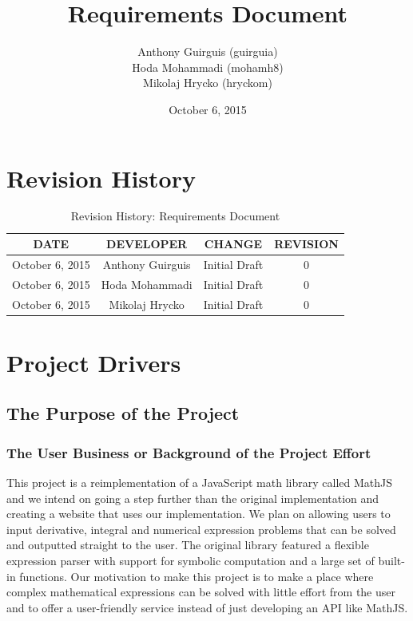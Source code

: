\documentclass[11pt, oneside]{article}
\title{Requirements Document}
\author{Anthony Guirguis (guirguia) \\ Hoda Mohammadi (mohamh8) \\ Mikolaj Hrycko (hryckom)}
\date{October 6, 2015}
\begin{document}
\maketitle
\newpage
\tableofcontents
\newpage

\listoftables
\listoffigures

\newpage
\section*{Revision History}

\begin{table}[hp]
\caption{Revision History: Requirements Document}
\begin{center}
\label{tab:}
\begin{tabular}{|c|c|c|c|}
\hline
\textbf{DATE} & \textbf{DEVELOPER} & \textbf{CHANGE} & \textbf{REVISION}\\
\hline
October 6, 2015 & Anthony Guirguis & Initial Draft & 0\\
\hline
October 6, 2015 & Hoda Mohammadi & Initial Draft & 0\\
\hline
October 6, 2015 & Mikolaj Hrycko & Initial Draft & 0\\
\hline
\end{tabular}
\end{center}
\label{default}
\end{table}

\newpage
\section{Project Drivers}
\subsection{The Purpose of the Project}
\subsubsection{The User Business or Background of the Project Effort}
This project is a  reimplementation of a JavaScript math library called MathJS and we intend on going a step further than the original implementation and creating a website that uses our implementation. We plan on allowing users to input derivative, integral and numerical expression problems that can be solved and outputted straight to the user. The original library featured a flexible expression parser with support for symbolic computation and a large set of built-in functions. Our motivation to make this project is to make a place where complex mathematical expressions can be solved with little effort from the user and to offer a user-friendly service instead of just developing an API like MathJS.
\end{document}
